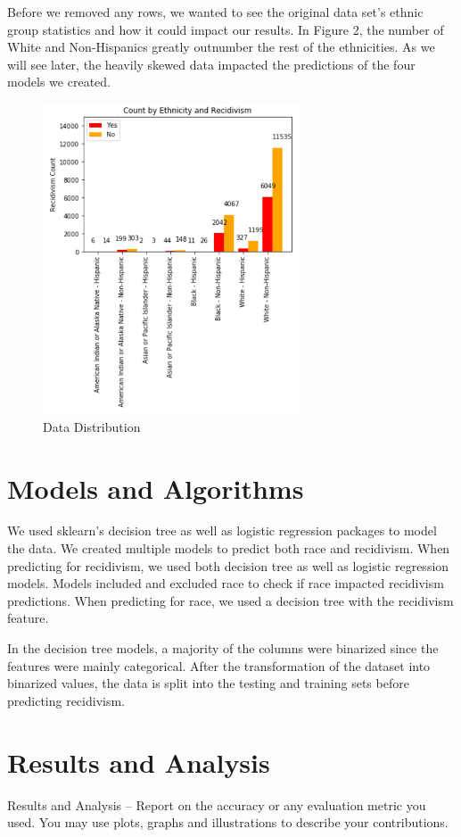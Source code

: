 \documentclass[11pt, sigconf]{acmart}
\begin{document}
Before we removed any rows, we wanted to see the original data set's ethnic group statistics and how it could impact our results. In Figure 2, the number of White and Non-Hispanics greatly outnumber the rest of the ethnicities. As we will see later, the heavily skewed data impacted the predictions of the four models we created.

\begin{figure}[h] 	
\centering
\includegraphics[width=3in]{1.png}
\caption{Data Distribution}
\end{figure}

\section{Models and Algorithms}

\hspace{5mm} We used sklearn’s decision tree as well as logistic regression packages to model the data. We created multiple models to predict both race and recidivism. When predicting for recidivism, we used both decision tree as well as logistic regression models. Models included and excluded race to check if race impacted recidivism predictions. When predicting for race, we used a decision tree with the recidivism feature.

In the decision tree models, a majority of the columns were binarized since the features were mainly categorical. After the transformation of the dataset into binarized values, the data is split into the testing and training sets before predicting recidivism.



\section{Results and Analysis}
Results and Analysis – Report on the accuracy or any evaluation metric you used. You may use
plots, graphs and
illustrations to describe your contributions.
\end{document}
